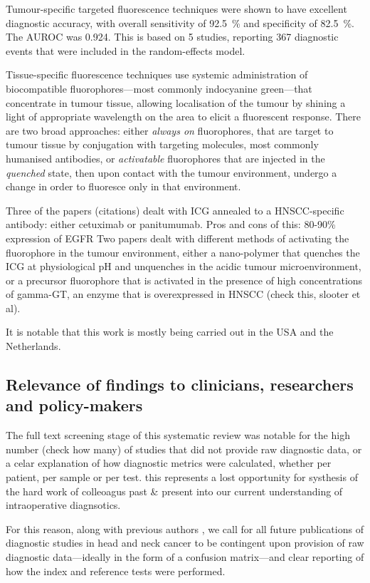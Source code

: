 Tumour-specific targeted fluorescence techniques were shown to have excellent diagnostic accuracy, with overall sensitivity of \SI{92.5}{\percent} and specificity of \SI{82.5}{\percent}. 
The AUROC was 0.924.
This is based on 5 studies, reporting 367 diagnostic events that were included in the random-effects model.

Tissue-specific fluorescence techniques use systemic administration of biocompatible fluorophores---most commonly indocyanine green---that concentrate in tumour tissue, allowing localisation of the tumour  by shining a light of appropriate wavelength on the area to elicit a fluorescent response.
There are two broad approaches: either \emph{always on} fluorophores, that are target to tumour tissue by conjugation with targeting molecules, most commonly humanised antibodies, or \emph{activatable} fluorophores that are injected in the \emph{quenched} state, then upon contact with the tumour environment, undergo a change in order to fluoresce only in that environment.

Three of the papers (citations) dealt with ICG annealed to a HNSCC-specific antibody: either cetuximab or panitumumab.
Pros and cons of this: 80-90\% expression of EGFR
Two papers dealt with different methods of activating the fluorophore in the tumour environment, either a nano-polymer that quenches the ICG at physiological pH and unquenches in the acidic tumour microenvironment, or a precursor fluorophore that is activated in the presence of high concentrations of gamma-GT, an enzyme that is overexpressed in HNSCC (check this, slooter et al).

It is notable that this work is mostly being carried out in the USA and the Netherlands.

\subsection{Relevance of findings to clinicians, researchers and policy-makers}

The full text screening stage of this systematic review was notable for the high number (check how many) of studies that did not provide raw diagnostic data, or a celar explanation of how diagnostic metrics were calculated, whether per patient, per sample or per test.
this represents a lost opportunity for systhesis of the hard work of colleoagus past \& present into our current understanding of intraoperative diagnsotics.

For this reason, along with previous authors \cite{stjohnDiagnosticAccuracyIntraoperative2017, irwigGuidelinesMetaanalysesEvaluating1994}, we call for all future publications of diagnostic studies in head and neck cancer to be contingent upon provision of raw diagnostic data---ideally in the form of a confusion matrix---and clear reporting of how the index and reference tests were performed.


